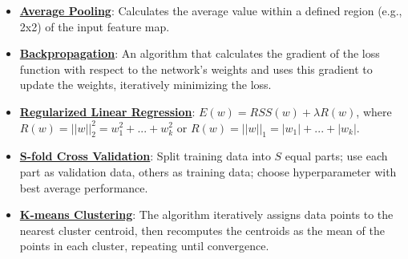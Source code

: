\documentclass{article}%
\begin{document}
\begin{itemize}[leftmargin=*]
\item \href{https://purdue.brightspace.com/d2l/common/assets/pdfjs-d2l-dist/1.0.14-legacy/web/viewer.html?file=\%2Fcontent\%2Fenforced\%2F1095467-wl.202510.CS.24300.001\%2F09L1-cnn.pdf\%3Fou\%3D1095467\&lang=en-us\&container=d2l-fileviewer-rendered-pdf\&fullscreen=d2l-fileviewer-rendered-pdf-dialog\&height=667#page=15}{\textbf{Average Pooling}}: Calculates the average value within a defined region (e.g., 2x2) of the input feature map.%
\item \href{https://purdue.brightspace.com/d2l/common/assets/pdfjs-d2l-dist/1.0.14-legacy/web/viewer.html?file=\%2Fcontent\%2Fenforced\%2F1095467-wl.202510.CS.24300.001\%2F09L1-cnn.pdf\%3Fou\%3D1095467\&lang=en-us\&container=d2l-fileviewer-rendered-pdf\&fullscreen=d2l-fileviewer-rendered-pdf-dialog\&height=667#page=16}{\textbf{Backpropagation}}: An algorithm that calculates the gradient of the loss function with respect to the network's weights and uses this gradient to update the weights, iteratively minimizing the loss.%
\item \href{https://purdue.brightspace.com/d2l/common/assets/pdfjs-d2l-dist/1.0.14-legacy/web/viewer.html?file=\%2Fcontent\%2Fenforced\%2F1095467-wl.202510.CS.24300.001\%2F10L1-CrossValidation.pdf\%3Fou\%3D1095467\&lang=en-us\&container=d2l-fileviewer-rendered-pdf\&fullscreen=d2l-fileviewer-rendered-pdf-dialog\&height=667#page=17}{\textbf{Regularized Linear Regression}}: $E(w) = RSS(w) + \lambda R(w)$, where $R(w) = ||w||_2^2 = w_1^2 + ... + w_k^2$ or $R(w) = ||w||_1 = |w_1| + ... + |w_k|$.%
\item \href{https://purdue.brightspace.com/d2l/common/assets/pdfjs-d2l-dist/1.0.14-legacy/web/viewer.html?file=\%2Fcontent\%2Fenforced\%2F1095467-wl.202510.CS.24300.001\%2F10L1-CrossValidation.pdf\%3Fou\%3D1095467\&lang=en-us\&container=d2l-fileviewer-rendered-pdf\&fullscreen=d2l-fileviewer-rendered-pdf-dialog\&height=667#page=25}{\textbf{S-fold Cross Validation}}: Split training data into $S$ equal parts; use each part as validation data, others as training data; choose hyperparameter with best average performance.%
\item \href{https://purdue.brightspace.com/d2l/common/assets/pdfjs-d2l-dist/1.0.14-legacy/web/viewer.html?file=\%2Fcontent\%2Fenforced\%2F1095467-wl.202510.CS.24300.001\%2F12L2-distance-clusters.pdf\%3Fou\%3D1095467\&lang=en-us\&container=d2l-fileviewer-rendered-pdf\&fullscreen=d2l-fileviewer-rendered-pdf-dialog\&height=667#page=22}{\textbf{K-means Clustering}}: The algorithm iteratively assigns data points to the nearest cluster centroid, then recomputes the centroids as the mean of the points in each cluster, repeating until convergence.%

\end{itemize}
\end{document}
